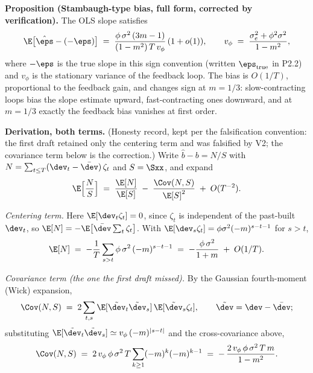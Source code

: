 \textbf{Proposition (Stambaugh-type bias, full form, corrected by verification).}
The OLS slope satisfies
\begin{equation*}
\E\big[\hat\eps-(-\eps)\big]
\;=\; \frac{\phi\,\sigma^2\,(3m-1)}{(1-m^2)\,T\,v_\phi}\,(1+o(1)),
\qquad
v_\phi \;=\; \frac{\sigma_e^2+\phi^2\sigma^2}{1-m^2},
\end{equation*}
where $-\eps$ is the true slope in this sign convention (written
$\eps_{\mathrm{true}}$ in P2.2) and $v_\phi$ is the stationary variance of the
feedback loop. The bias is $O(1/T)$, proportional to the feedback gain, and changes
sign at $m=1/3$: slow-contracting loops bias the slope estimate upward,
fast-contracting ones downward, and at $m=1/3$ exactly the feedback bias vanishes
at first order.

\textbf{Derivation, both terms.} (Honesty record, kept per the falsification
convention: the first draft retained only the centering term and was falsified by
V2; the covariance term below is the correction.) Write $\hat b - b = N/S$ with
$N=\sum_{t\le T}(\dev_t-\bar{\dev})\,\zeta_t$ and $S=\Sxx$, and expand
\begin{equation*}
\E\Big[\frac{N}{S}\Big]
\;=\; \frac{\E[N]}{\E[S]} \;-\; \frac{\Cov(N,S)}{\E[S]^2} \;+\; O(T^{-2}).
\end{equation*}

\emph{Centering term.} Here $\E[\dev_t\zeta_t]=0$, since $\zeta_t$ is independent
of the past-built $\dev_t$, so $\E[N]=-\E\big[\bar{\dev}\sum_t\zeta_t\big]$. With
$\E[\dev_s\zeta_t]=\phi\sigma^2(-m)^{s-t-1}$ for $s>t$,
\begin{equation*}
\E[N]
\;=\; -\frac{1}{T}\sum_{s>t}\phi\,\sigma^2\,(-m)^{s-t-1}
\;=\; -\frac{\phi\,\sigma^2}{1+m} \;+\; O(1/T).
\end{equation*}

\emph{Covariance term (the one the first draft missed).} By the Gaussian
fourth-moment (Wick) expansion,
\begin{equation*}
\Cov(N,S)
\;=\; 2\sum_{t,s}\E[\tilde{\dev}_t\tilde{\dev}_s]\,\E[\tilde{\dev}_s\zeta_t],
\qquad \tilde{\dev} = \dev-\bar{\dev};
\end{equation*}
substituting $\E[\tilde{\dev}_t\tilde{\dev}_s]\simeq v_\phi\,(-m)^{|s-t|}$ and the
cross-covariance above,
\begin{equation*}
\Cov(N,S)
\;=\; 2\,v_\phi\,\phi\,\sigma^2\,T\sum_{k\ge 1}(-m)^{k}(-m)^{k-1}
\;=\; -\,\frac{2\,v_\phi\,\phi\,\sigma^2\,T\,m}{1-m^2}.
\end{equation*}

